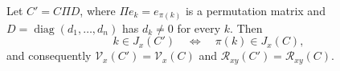 Let \(C'=C\Pi D\), where \(\Pi e_k=e_{\pi(k)}\) is a permutation matrix and \(D=\operatorname{diag}(d_1,\ldots,d_n)\) has \(d_k\ne0\) for every \(k\). Then
\[
 k\in J_x(C')\quad\Longleftrightarrow\quad \pi(k)\in J_x(C),
\]
and consequently \(\mathcal V_x(C')=\mathcal V_x(C)\) and \(\mathcal R_{xy}(C')=\mathcal R_{xy}(C)\).